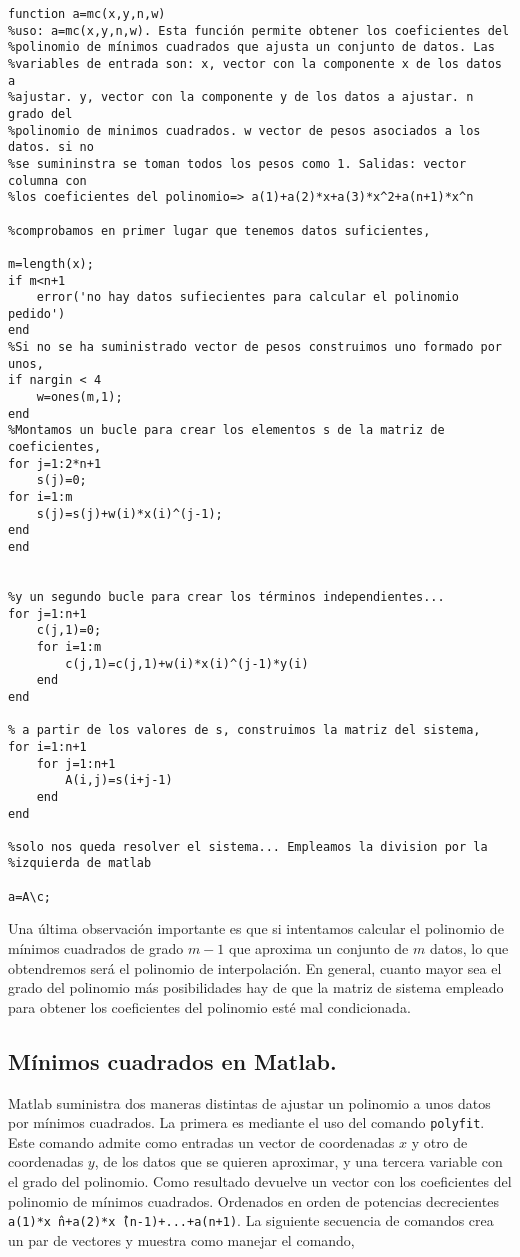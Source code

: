 \begin{verbatim}
function a=mc(x,y,n,w)
%uso: a=mc(x,y,n,w). Esta función permite obtener los coeficientes del
%polinomio de mínimos cuadrados que ajusta un conjunto de datos. Las
%variables de entrada son: x, vector con la componente x de los datos a
%ajustar. y, vector con la componente y de los datos a ajustar. n grado del
%polinomio de minimos cuadrados. w vector de pesos asociados a los datos. si no
%se sumininstra se toman todos los pesos como 1. Salidas: vector columna con
%los coeficientes del polinomio=> a(1)+a(2)*x+a(3)*x^2+a(n+1)*x^n

%comprobamos en primer lugar que tenemos datos suficientes,

m=length(x);
if m<n+1
    error('no hay datos sufiecientes para calcular el polinomio pedido')
end
%Si no se ha suministrado vector de pesos construimos uno formado por unos,
if nargin < 4
	w=ones(m,1);
end
%Montamos un bucle para crear los elementos s de la matriz de coeficientes,
for j=1:2*n+1
    s(j)=0;    
for i=1:m
    s(j)=s(j)+w(i)*x(i)^(j-1);
end
end


%y un segundo bucle para crear los términos independientes...
for j=1:n+1
    c(j,1)=0;
    for i=1:m
        c(j,1)=c(j,1)+w(i)*x(i)^(j-1)*y(i)
    end
end

% a partir de los valores de s, construimos la matriz del sistema,
for i=1:n+1
    for j=1:n+1
        A(i,j)=s(i+j-1)
    end
end

%solo nos queda resolver el sistema... Empleamos la division por la
%izquierda de matlab

a=A\c;
\end{verbatim}

Una última observación importante es que si intentamos calcular el polinomio de mínimos cuadrados de grado $m-1$ que aproxima un conjunto de $m$ datos, lo que obtendremos será el polinomio de interpolación. En general, cuanto mayor sea el grado del polinomio más posibilidades hay de que la matriz de sistema empleado para obtener los coeficientes del polinomio esté mal condicionada.

\subsection{Mínimos cuadrados en Matlab.}

Matlab suministra dos maneras distintas de ajustar un polinomio a unos datos por mínimos cuadrados. La primera es mediante el uso del comando \texttt{polyfit}. Este comando admite como entradas un vector de coordenadas $x$ y otro de coordenadas $y$, de los datos que se quieren aproximar, y una tercera variable con el grado del polinomio. Como resultado devuelve un vector con los coeficientes del polinomio de mínimos cuadrados. Ordenados en orden de potencias decrecientes \texttt{a(1)*x\^\  n+a(2)*x\^\  (n-1)+...+a(n+1)}. La siguiente secuencia de comandos crea un par de vectores y muestra como manejar el comando,



